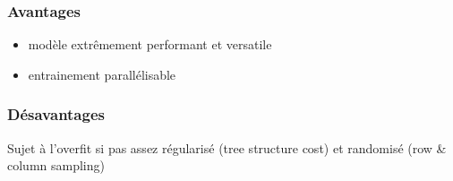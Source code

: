 \begin{frame}
  \frametitle{Avantages}

  \begin{itemize}
  \item modèle extrêmement performant et versatile
  \item entrainement parallélisable
  \end{itemize}
\end{frame}

\begin{frame}
  \frametitle{Désavantages}

  Sujet à l'overfit si pas assez régularisé (tree structure cost) et
  randomisé (row \& column sampling)
\end{frame}
